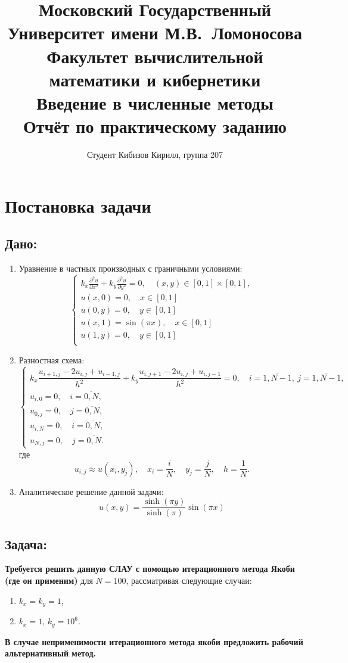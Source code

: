 \documentclass[a4paper, fleqn]{report}
\title{
\textbf{Московский Государственный Университет имени М.В.\ Ломоносова}\\
\textbf{Факультет вычислительной математики и кибернетики}\\
\textbf{Введение в численные методы}\\
Отчёт по практическому заданию
}
\author{
Студент Кибизов Кирилл, группа 207
}
\date{\number\year}
\begin{document}
\maketitle

\tableofcontents

\chapter*{Постановка задачи}

\section*{Дано:}
\begin{enumerate}[label=\arabic*.]
\item Уравнение в частных производных с граничными условиями:
\[
\begin{cases}
k_x \frac{\partial^2 u}{\partial x^2} + k_y \frac{\partial^2 u}{\partial y^2} = 0, \quad (x, y) \in [0, 1] \times [0, 1], \\
u(x, 0) = 0, \quad x \in [0, 1] \\
u(0, y) = 0, \quad y \in [0, 1] \\
u(x, 1) = \sin(\pi x), \quad x \in [0, 1] \\
u(1, y) = 0, \quad y \in [0, 1] \\
\end{cases}
\]
\item Разностная схема:
\[
\begin{cases}
k_x \dfrac{u_{i+1,j} - 2u_{i,j} + u_{i-1,j}}{h^2} + k_y \dfrac{u_{i,j+1} - 2u_{i,j} + u_{i,j-1}}{h^2} = 0, \quad i = \overline{1,N-1},\ j = \overline{1,N-1}, \\
u_{i,0} = 0, \quad i = \overline{0,N}, \\
u_{0,j} = 0, \quad j = \overline{0,N}, \\
u_{i,N} = 0, \quad i = \overline{0,N}, \\
u_{N,j} = 0, \quad j = \overline{0,N}.
\end{cases}
\]
где
\[
u_{i,j} \approx u(x_i, y_j), \quad x_i = \dfrac{i}{N}, \quad y_j = \dfrac{j}{N}, \quad h = \dfrac{1}{N}.
\]
\item Аналитическое решение данной задачи:
\[
u(x, y) = \dfrac{\sinh(\pi y)}{\sinh(\pi)} \sin(\pi x)
\]
\end{enumerate}

\section*{Задача:}
\textbf{Требуется решить данную СЛАУ с помощью итерационного метода Якоби (где он применим)} для $N = 100$, рассматривая следующие случаи:
\begin{enumerate}
    \item $k_x = k_y = 1$,
    \item $k_x = 1$, $k_y = 10^6$.
\end{enumerate}
\textbf{В случае неприменимости итерационного метода якоби предложить рабочий альтернативный метод.}
\end{document}
